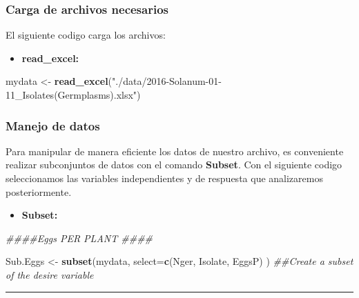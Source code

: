 \documentclass[]{article}
\newenvironment{Shaded}{\begin{snugshade}}{\end{snugshade}}
\newcommand{\CommentTok}[1]{\textcolor[rgb]{0.56,0.35,0.01}{\textit{#1}}}
\newcommand{\DataTypeTok}[1]{\textcolor[rgb]{0.13,0.29,0.53}{#1}}
\newcommand{\KeywordTok}[1]{\textcolor[rgb]{0.13,0.29,0.53}{\textbf{#1}}}
\newcommand{\NormalTok}[1]{#1}
\newcommand{\StringTok}[1]{\textcolor[rgb]{0.31,0.60,0.02}{#1}}
\providecommand{\tightlist}{%
  \setlength{\itemsep}{0pt}\setlength{\parskip}{0pt}}
\begin{document}
\hypertarget{carga-de-archivos-necesarios}{%
\subsubsection{Carga de archivos
necesarios}\label{carga-de-archivos-necesarios}}

El siguiente codigo carga los archivos:

\begin{itemize}
\tightlist
\item
  \textbf{read\_excel:}
\end{itemize}

\begin{Shaded}
\begin{Highlighting}[]
\NormalTok{mydata <-}\StringTok{ }\KeywordTok{read_excel}\NormalTok{(}\StringTok{"./data/2016-Solanum-01-11_Isolates(Germplasms).xlsx"}\NormalTok{)}
\end{Highlighting}
\end{Shaded}

\hypertarget{manejo-de-datos}{%
\subsubsection{Manejo de datos}\label{manejo-de-datos}}

Para manipular de manera eficiente los datos de nuestro archivo, es
conveniente realizar subconjuntos de datos con el comando
\textbf{Subset}. Con el siguiente codigo seleccionamos las variables
independientes y de respuesta que analizaremos posteriormente.

\begin{itemize}
\tightlist
\item
  \textbf{Subset:}
\end{itemize}

\begin{Shaded}
\begin{Highlighting}[]
\CommentTok{####Eggs PER PLANT ####}

\NormalTok{Sub.Eggs <-}\StringTok{ }\KeywordTok{subset}\NormalTok{(mydata,}
                   \DataTypeTok{select=}\KeywordTok{c}\NormalTok{(Nger, }
\NormalTok{                            Isolate, }
\NormalTok{                            EggsP) ) }
\CommentTok{##Create a subset of the desire variable}
\end{Highlighting}
\end{Shaded}

\begin{center}\rule{0.5\linewidth}{\linethickness}\end{center}
\end{document}
